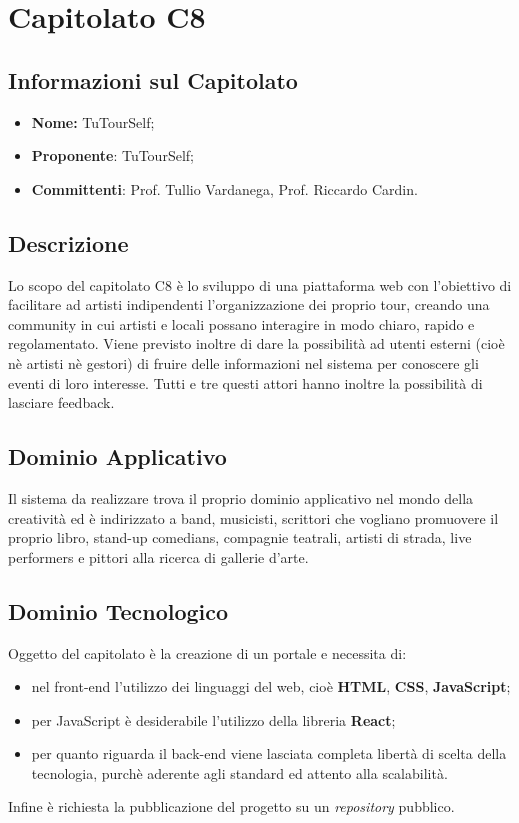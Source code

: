 \section{Capitolato C8}
\subsection{Informazioni sul Capitolato}
	\begin{itemize}
		\item \textbf{Nome:}
		 TuTourSelf;
		\item \textbf{Proponente}:
		 TuTourSelf;
		\item \textbf{Committenti}:
		Prof. Tullio Vardanega, Prof. Riccardo Cardin.
	\end{itemize}

\subsection{Descrizione}
	Lo scopo del capitolato C8 è lo sviluppo di una piattaforma web con l'obiettivo di facilitare ad artisti indipendenti l'organizzazione dei proprio tour, creando una community in cui artisti e locali possano interagire in modo chiaro, rapido e regolamentato. 
	Viene previsto inoltre di dare la possibilità ad utenti esterni (cioè nè artisti nè gestori) di fruire delle informazioni nel sistema per conoscere gli eventi di loro interesse. Tutti e tre questi attori hanno inoltre la possibilità di lasciare feedback.
	
\subsection{Dominio Applicativo}
	Il sistema da realizzare trova il proprio dominio applicativo nel mondo della creatività ed è indirizzato a band, musicisti, scrittori che vogliano promuovere
	il proprio libro, stand-up comedians, compagnie teatrali, artisti di strada, live
	performers e pittori alla ricerca di gallerie d’arte.

\subsection{Dominio Tecnologico}
	Oggetto del capitolato è la creazione di un portale e necessita di:
		\begin{itemize}
			\item nel front-end l'utilizzo dei linguaggi del web, cioè \textbf{HTML}, \textbf{CSS}, \textbf{JavaScript};
			\item per JavaScript è desiderabile l'utilizzo della libreria \textbf{React};
			\item per quanto riguarda il back-end viene lasciata completa libertà di scelta della tecnologia, purchè aderente agli standard ed attento alla scalabilità.
		\end{itemize}
		Infine è richiesta la pubblicazione del progetto su un \textit{repository} pubblico.

